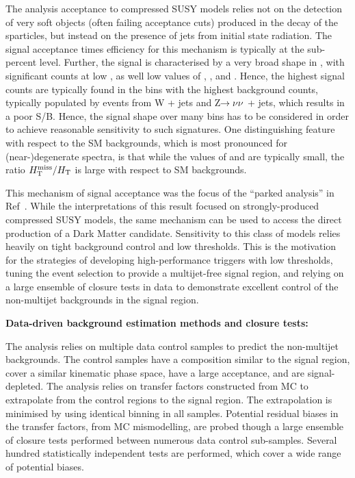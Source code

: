 The analysis acceptance to compressed SUSY models relies not on
the detection of very soft objects (often failing acceptance cuts)
produced in the decay of the sparticles, but instead on the presence
of jets from initial state radiation. The signal acceptance times
efficiency for this mechanism is typically at the sub-percent level.
Further, the signal is characterised by a very broad shape in \scalht,
with significant counts at low \scalht, as well low values of \njet,
\nb, and \mht. Hence, the highest signal counts are typically found in
the bins with the highest background counts, typically populated by
events from W + jets and Z$\rightarrow\nu\nu$ + jets, which results in a poor
S/B. Hence, the signal shape over many bins has to be considered in
order to achieve reasonable sensitivity to such signatures. One
distinguishing feature with respect to the SM backgrounds, which is
most pronounced for (near-)degenerate spectra, is that while the
values of \scalht and \mht are typically small, the ratio $\mbox{$H_{\rm T}^{\rm miss}$} /
\mbox{$H_\text{T}$}$ is large with respect to SM backgrounds.

This mechanism of signal acceptance was the focus of the ``parked
analysis'' in Ref~\cite{Khachatryan:2016pxa}. While the interpretations of
this result focused on strongly-produced compressed SUSY models, the
same mechanism can be used to access the direct production of a Dark
Matter candidate. Sensitivity to this
class of models relies heavily on tight background control and low
thresholds. This is the motivation for the strategies of developing
high-performance triggers with low thresholds, tuning the event
selection to provide a multijet-free signal region, and relying on a
large ensemble of closure tests in data to demonstrate excellent
control of the non-multijet backgrounds in the signal region.

{\bf Data-driven background estimation methods and closure tests:}

The analysis relies on multiple data control samples to predict the
non-multijet backgrounds. The control samples have a composition
similar to the signal region, cover a similar kinematic phase
space, have a large acceptance, and are signal-depleted. The analysis
relies on transfer factors constructed from MC to extrapolate from the
control regions to the signal region. The extrapolation is minimised
by using identical binning in all samples. Potential residual biases
in the transfer factors, \eg from MC mismodelling, are probed though a
large ensemble of closure tests performed between numerous data
control sub-samples. Several hundred statistically independent tests
are performed, which cover a wide range of potential biases. 

